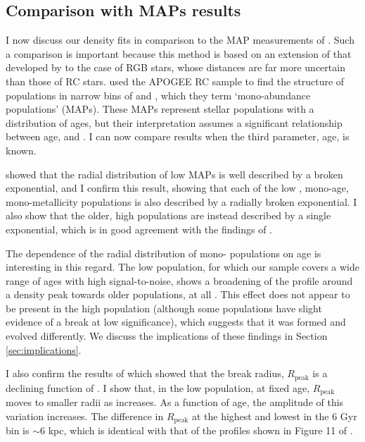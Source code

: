 \subsection{Comparison with MAPs results}
\label{sec:bovycomparison}
I now discuss our density fits in comparison to the MAP measurements of \citet{2012ApJ...753..148B,2016ApJ...823...30B}. Such a comparison is important because this method is based on an extension of that developed by \citet{2016ApJ...823...30B} to the case of RGB stars, whose distances are far more uncertain than those of RC stars. \citet{2016ApJ...823...30B} used the APOGEE RC sample to find the structure of populations in narrow bins of \afe{} and \feh{}, which they term `mono-abundance populations' (MAPs). These MAPs represent stellar populations with a distribution of ages, but their interpretation assumes a significant relationship between age, \afe{} and \feh{}. I can now compare results when the third parameter, age, is known.  

\citet{2016ApJ...823...30B} showed that the radial distribution of low \afe{} MAPs is well described by a broken exponential, and I confirm this result, showing that each of the low \afe{}, mono-age, mono-metallicity populations is also described by a radially broken exponential. I also show that the older, high \afe{} populations are instead described by a single exponential, which is in good agreement with the findings of \citet{2016ApJ...823...30B}.

The dependence of the radial distribution of mono-\feh{} populations on age is interesting in this regard.  The low \afe{} population, for which our sample covers a wide range of ages with high signal-to-noise, shows a broadening of the profile around a density peak towards older populations, at all \feh{}. This effect does not appear to be present in the high \afe{} population (although some populations have slight evidence of a break at low significance), which suggests that it was formed and evolved differently. We discuss the implications of these findings in Section \ref{sec:implications}.

I also confirm the results of \citet{2016ApJ...823...30B} which showed that the break radius, $R_{\mathrm{peak}}$ is a declining function of \feh{}. I show that, in the low \afe{} population, at fixed age, $R_{\mathrm{peak}}$ moves to smaller radii as \feh{} increases. As a function of age, the amplitude of this variation increases. The difference in $R_{\mathrm{peak}}$ at the highest and lowest \feh{} in the 6 Gyr bin is $\sim 6$ kpc, which is identical with that of the profiles shown in Figure 11 of \citet{2016ApJ...823...30B}.
 
